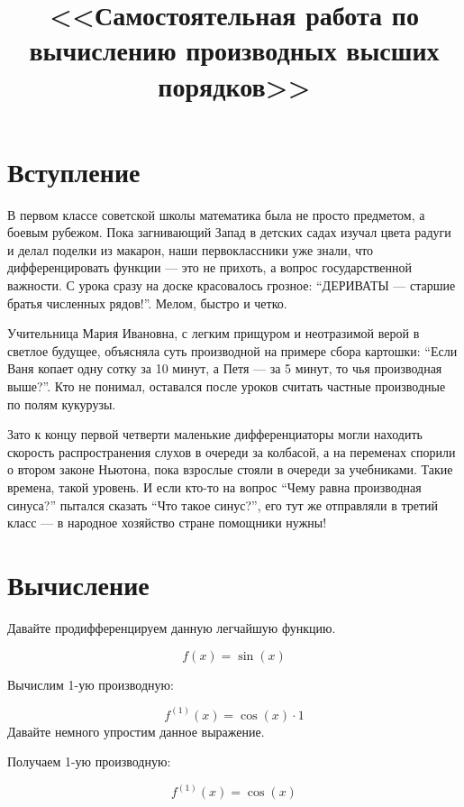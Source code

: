 \documentclass[12pt,a4paper]{extreport}
\title{<<Самостоятельная работа по вычислению производных высших порядков>>}
\begin{document}
\maketitle
\pagebreak
\tableofcontents
\pagebreak
\section{Вступление}
В первом классе советской школы математика была не просто предметом, а боевым рубежом. Пока загнивающий Запад в детских садах изучал цвета радуги и делал поделки из макарон, наши первоклассники уже знали, что дифференцировать функции — это не прихоть, а вопрос государственной важности. С урока сразу на доске красовалось грозное: “ДЕРИВАТЫ — старшие братья численных рядов!”. Мелом, быстро и четко. 

Учительница Мария Ивановна, с легким прищуром и неотразимой верой в светлое будущее, объясняла суть производной на примере сбора картошки: “Если Ваня копает одну сотку за 10 минут, а Петя — за 5 минут, то чья производная выше?”. Кто не понимал, оставался после уроков считать частные производные по полям кукурузы.



Зато к концу первой четверти маленькие дифференциаторы могли находить скорость распространения слухов в очереди за колбасой, а на переменах спорили о втором законе Ньютона, пока взрослые стояли в очереди за учебниками. Такие времена, такой уровень. И если кто-то на вопрос “Чему равна производная синуса?” пытался сказать “Что такое синус?”, его тут же отправляли в третий класс — в народное хозяйство стране помощники нужны!\section{Вычисление}


Давайте продифференцируем данную легчайшую функцию.

\begin{dmath*}
f(x) = \sin(x)
\end{dmath*}

Вычислим 1-ую производную:

\begin{dmath*}
f^{(1)}(x) = \cos(x) \cdot 1
\end{dmath*}
Давайте немного упростим данное выражение.


Получаем 1-ую производную:

\begin{dmath*}
f^{(1)}(x) = \cos(x)
\end{dmath*}
\end{document}
